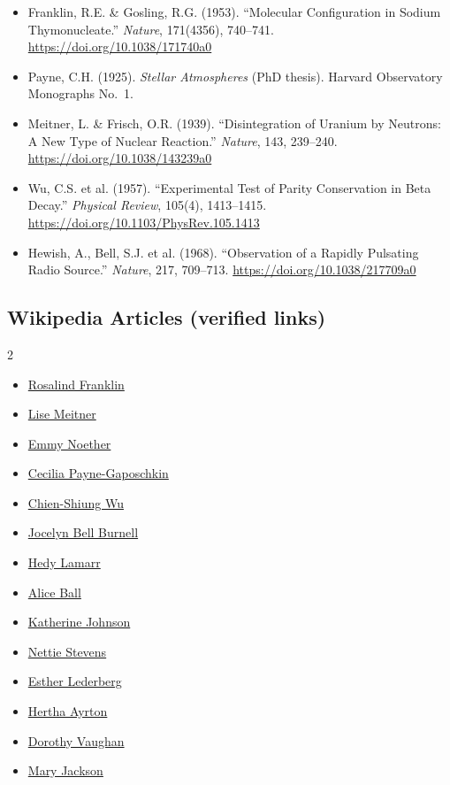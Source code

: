 \documentclass[12pt,a4paper]{article}
\begin{document}
\begin{itemize}[itemsep=6pt]
\item Franklin, R.E. \& Gosling, R.G. (1953). ``Molecular Configuration in Sodium Thymonucleate.'' \textit{Nature}, 171(4356), 740--741. \url{https://doi.org/10.1038/171740a0}
\item Payne, C.H. (1925). \textit{Stellar Atmospheres} (PhD thesis). Harvard Observatory Monographs No.~1.
\item Meitner, L. \& Frisch, O.R. (1939). ``Disintegration of Uranium by Neutrons: A New Type of Nuclear Reaction.'' \textit{Nature}, 143, 239--240. \url{https://doi.org/10.1038/143239a0}
\item Wu, C.S. et al. (1957). ``Experimental Test of Parity Conservation in Beta Decay.'' \textit{Physical Review}, 105(4), 1413--1415. \url{https://doi.org/10.1103/PhysRev.105.1413}
\item Hewish, A., Bell, S.J. et al. (1968). ``Observation of a Rapidly Pulsating Radio Source.'' \textit{Nature}, 217, 709--713. \url{https://doi.org/10.1038/217709a0}
\end{itemize}

\subsection*{Wikipedia Articles (verified links)}

\begin{multicols}{2}
\begin{itemize}[itemsep=4pt, label=\textcolor{steelblue}{\textbullet}]
\item \href{https://en.wikipedia.org/wiki/Rosalind_Franklin}{Rosalind Franklin}
\item \href{https://en.wikipedia.org/wiki/Lise_Meitner}{Lise Meitner}
\item \href{https://en.wikipedia.org/wiki/Emmy_Noether}{Emmy Noether}
\item \href{https://en.wikipedia.org/wiki/Cecilia_Payne-Gaposchkin}{Cecilia Payne-Gaposchkin}
\item \href{https://en.wikipedia.org/wiki/Chien-Shiung_Wu}{Chien-Shiung Wu}
\item \href{https://en.wikipedia.org/wiki/Jocelyn_Bell_Burnell}{Jocelyn Bell Burnell}
\item \href{https://en.wikipedia.org/wiki/Hedy_Lamarr}{Hedy Lamarr}
\item \href{https://en.wikipedia.org/wiki/Alice_Ball}{Alice Ball}
\item \href{https://en.wikipedia.org/wiki/Katherine_Johnson}{Katherine Johnson}
\item \href{https://en.wikipedia.org/wiki/Nettie_Stevens}{Nettie Stevens}
\item \href{https://en.wikipedia.org/wiki/Esther_Lederberg}{Esther Lederberg}
\item \href{https://en.wikipedia.org/wiki/Hertha_Ayrton}{Hertha Ayrton}
\item \href{https://en.wikipedia.org/wiki/Dorothy_Vaughan}{Dorothy Vaughan}
\item \href{https://en.wikipedia.org/wiki/Mary_Jackson_(engineer)}{Mary Jackson}
\end{itemize}
\end{multicols}
\end{document}
